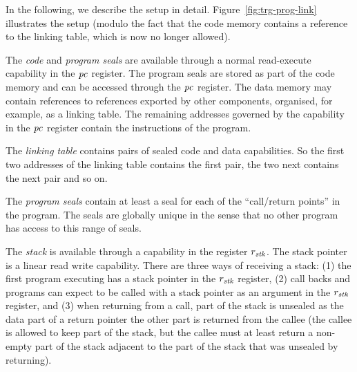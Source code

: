 \documentclass[a4paper]{article}
\begin{document}
In the following, we describe the setup in detail.
Figure~\ref{fig:trg-prog-link} illustrates the setup (modulo the fact that the code memory contains a reference to the linking table, which is now no longer allowed).

The \emph{code} and \emph{program seals} are available through a normal read-execute capability in the $\mathit{pc}$ register.
The program seals are stored as part of the code memory and can be accessed through the $\mathit{pc}$ register.
The data memory may contain references to references exported by other components, organised, for example, as a linking table.
The remaining addresses governed by the capability in the $\mathit{pc}$ register contain the instructions of the program.

The \emph{linking table} contains pairs of sealed code and data capabilities.
So the first two addresses of the linking table contains the first pair, the two next contains the next pair and so on.

The \emph{program seals} contain at least a seal for each of the ``call/return points'' in the program.
The seals are globally unique in the sense that no other program has access to this range of seals.

The \emph{stack} is available through a capability in the register $r_{\mathit{stk}}$. The stack pointer is a linear read write capability. There are three ways of receiving a stack: (1) the first program executing has a stack pointer in the $r_{\mathit{stk}}$ register, (2) call backs and programs can expect to be called with a stack pointer as an argument in the $r_{\mathit{stk}}$ register, and (3) when returning from a call, part of the stack is unsealed as the data part of a return pointer the other part is returned from the callee (the callee is allowed to keep part of the stack, but the callee must at least return a non-empty part of the stack adjacent to the part of the stack that was unsealed by returning).
\end{document}
